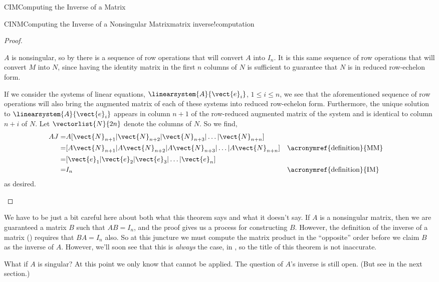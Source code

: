 \begin{subsect}{CIM}{Computing the Inverse of a Matrix}
\begin{theorem}{CINM}{Computing the Inverse of a Nonsingular Matrix}{matrix inverse!computation}
\end{theorem}
%
\begin{proof}
\begin{para}$A$ is nonsingular, so by  there is a sequence of row operations that will convert $A$ into $I_n$.  It is this same sequence of row operations that will convert $M$ into $N$, since having the identity matrix in the first $n$ columns of $N$ is sufficient to guarantee that $N$ is in reduced row-echelon form.\end{para}
%
\begin{para}If we consider the systems of linear equations, $\linearsystem{A}{\vect{e}_i}$, $1\leq i\leq n$, we see that the aforementioned sequence of row operations will also bring the augmented matrix of each of these systems into reduced row-echelon form.  Furthermore, the unique solution to $\linearsystem{A}{\vect{e}_i}$ appears in column $n+1$ of the row-reduced augmented matrix of the system and is identical to column $n+i$ of $N$.  Let $\vectorlist{N}{2n}$ denote the columns of $N$.  So we find,
%
\begin{align*}
AJ=&A[\vect{N}_{n+1}|\vect{N}_{n+2}|\vect{N}_{n+3}|\ldots|\vect{N}_{n+n}]\\
=&[A\vect{N}_{n+1}|A\vect{N}_{n+2}|A\vect{N}_{n+3}|\ldots|A\vect{N}_{n+n}]&&\text{\acronymref{definition}{MM}}\\
=&[\vect{e}_1|\vect{e}_2|\vect{e}_3|\ldots|\vect{e}_n]\\
=&I_n&&\text{\acronymref{definition}{IM}}
\end{align*}
%
as desired.\end{para}
%
\end{proof}
%
\begin{para}We have to be just a bit careful here about both what this theorem says and what it doesn't say.  If $A$ is a nonsingular matrix, then we are guaranteed a matrix $B$ such that $AB=I_n$, and the proof gives us a process for constructing $B$.   However, the definition of the inverse of a matrix () requires that $BA=I_n$ also.  So at this juncture we must compute the matrix product in the ``opposite'' order before we claim $B$ as the inverse of $A$.  However, we'll soon see that this is {\em always} the case, in , so the title of this theorem is not inaccurate.\end{para}
%
\begin{para}What if $A$ is singular?  At this point we only know that  cannot be applied.  The question of $A$'s inverse is still open.  (But see  in the next section.)\end{para}

\end{subsect}
